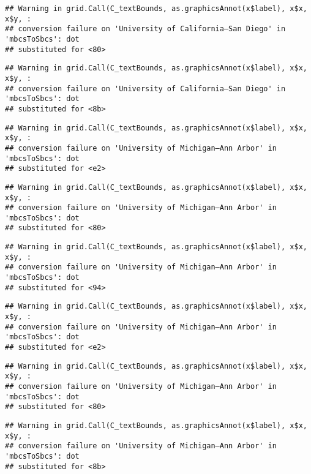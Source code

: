 \documentclass[]{article}
\begin{document}
\begin{verbatim}
## Warning in grid.Call(C_textBounds, as.graphicsAnnot(x$label), x$x, x$y, :
## conversion failure on 'University of California—​San Diego' in 'mbcsToSbcs': dot
## substituted for <80>
\end{verbatim}

\begin{verbatim}
## Warning in grid.Call(C_textBounds, as.graphicsAnnot(x$label), x$x, x$y, :
## conversion failure on 'University of California—​San Diego' in 'mbcsToSbcs': dot
## substituted for <8b>
\end{verbatim}

\begin{verbatim}
## Warning in grid.Call(C_textBounds, as.graphicsAnnot(x$label), x$x, x$y, :
## conversion failure on 'University of Michigan—​Ann Arbor' in 'mbcsToSbcs': dot
## substituted for <e2>
\end{verbatim}

\begin{verbatim}
## Warning in grid.Call(C_textBounds, as.graphicsAnnot(x$label), x$x, x$y, :
## conversion failure on 'University of Michigan—​Ann Arbor' in 'mbcsToSbcs': dot
## substituted for <80>
\end{verbatim}

\begin{verbatim}
## Warning in grid.Call(C_textBounds, as.graphicsAnnot(x$label), x$x, x$y, :
## conversion failure on 'University of Michigan—​Ann Arbor' in 'mbcsToSbcs': dot
## substituted for <94>
\end{verbatim}

\begin{verbatim}
## Warning in grid.Call(C_textBounds, as.graphicsAnnot(x$label), x$x, x$y, :
## conversion failure on 'University of Michigan—​Ann Arbor' in 'mbcsToSbcs': dot
## substituted for <e2>
\end{verbatim}

\begin{verbatim}
## Warning in grid.Call(C_textBounds, as.graphicsAnnot(x$label), x$x, x$y, :
## conversion failure on 'University of Michigan—​Ann Arbor' in 'mbcsToSbcs': dot
## substituted for <80>
\end{verbatim}

\begin{verbatim}
## Warning in grid.Call(C_textBounds, as.graphicsAnnot(x$label), x$x, x$y, :
## conversion failure on 'University of Michigan—​Ann Arbor' in 'mbcsToSbcs': dot
## substituted for <8b>
\end{verbatim}
\end{document}
